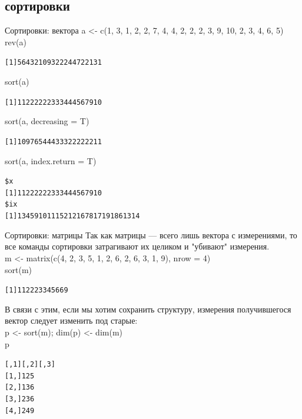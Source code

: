 \subsection{сортировки}
\begin{frame}[fragile]{Сортировки: вектора}
a <- c(1, 3, 1, 2, 2, 7, 4, 4, 2, 2, 2, 3, 9, 10, 2, 3, 4, 6, 5)\\
rev(a)
\footnotesize
\begin{alltt}
[1]  5  6  4  3  2 10  9  3  2  2  2  4  4  7  2  2  1  3  1
\end{alltt}
\normalsize
sort(a)
\footnotesize
\begin{alltt}
[1]  1  1  2  2  2  2  2  2  3  3  3  4  4  4  5  6  7  9 10
\end{alltt}
\normalsize
sort(a, decreasing = T)
\footnotesize
\begin{alltt}
[1] 10  9  7  6  5  4  4  4  3  3  3  2  2  2  2  2  2  1  1
\end{alltt}
\normalsize
sort(a, index.return = T)
\footnotesize
\begin{alltt}
\$x
[1]  1  1  2  2  2  2  2  2  3  3  3  4  4  4  5  6  7  9 10
\$ix
[1]  1  3  4  5  9 10 11 15  2 12 16  7  8 17 19 18  6 13 14
\end{alltt}
\normalsize
\end{frame}
\begin{frame}[fragile]{Сортировки: матрицы}
Так как матрицы — всего лишь вектора с измерениями, то все команды сортировки затрагивают их целиком и "убивают"{} измерения.\\
m <- matrix(c(4, 2, 3, 5, 1, 2, 6, 2, 6, 3, 1, 9), nrow = 4)\\
sort(m)
\footnotesize
\begin{alltt}
[1] 1 1 2 2 2 3 3 4 5 6 6 9
\end{alltt}
\normalsize
В связи с этим, если мы хотим сохранить структуру, измерения получившегося вектор следует изменить под старые:\\
p <- sort(m); dim(p) <- dim(m)\\
p
\footnotesize
\begin{alltt}
     [,1] [,2] [,3]
[1,]    1    2    5
[2,]    1    3    6
[3,]    2    3    6
[4,]    2    4    9
\end{alltt}
\normalsize
\end{frame}
